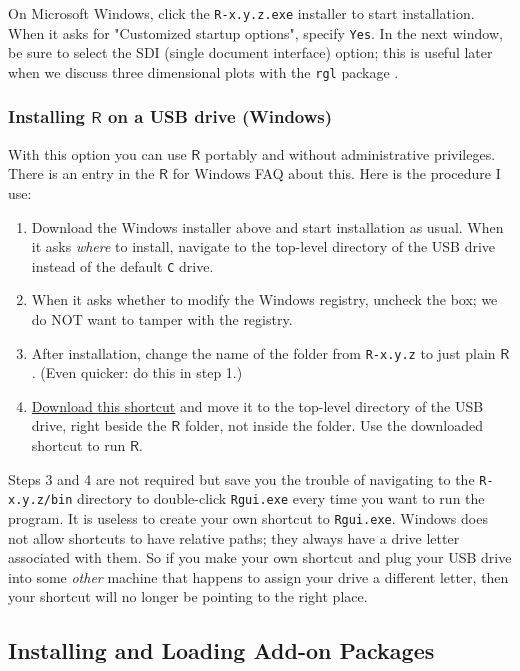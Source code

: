 On Microsoft Windows, click the \texttt{R-x.y.z.exe} installer to start
installation. When it asks for "Customized startup options", specify
\texttt{Yes}. In the next window, be sure to select the SDI (single document
interface) option; this is useful later when we discuss three
dimensional plots with the \texttt{rgl} package \cite{rgl}.

\subsubsection{Installing \(\mathsf{R}\) on a USB drive (Windows)}
\label{sec-2-1-1-1}

With this option you can use \(\mathsf{R}\) portably and without
administrative privileges. There is an entry in the \(\mathsf{R}\) for
Windows FAQ about this. Here is the procedure I use:
\begin{enumerate}
\item Download the Windows installer above and start installation as
usual. When it asks \emph{where} to install, navigate to the top-level
directory of the USB drive instead of the default \texttt{C} drive.
\item When it asks whether to modify the Windows registry, uncheck the
box; we do NOT want to tamper with the registry.
\item After installation, change the name of the folder from \texttt{R-x.y.z} to
just plain \(\mathsf{R}\). (Even quicker: do this in step 1.)
\item \href{http://ipsur.r-forge.r-project.org/book/download/R.exe}{Download this shortcut} and move it to the top-level directory of
the USB drive, right beside the \(\mathsf{R}\) folder, not inside
the folder. Use the downloaded shortcut to run \(\mathsf{R}\).
\end{enumerate}

Steps 3 and 4 are not required but save you the trouble of navigating
to the \texttt{R-x.y.z/bin} directory to double-click \texttt{Rgui.exe} every time
you want to run the program. It is useless to create your own shortcut
to \texttt{Rgui.exe}. Windows does not allow shortcuts to have relative
paths; they always have a drive letter associated with them. So if you
make your own shortcut and plug your USB drive into some \emph{other}
machine that happens to assign your drive a different letter, then
your shortcut will no longer be pointing to the right place.

\subsection{Installing and Loading Add-on Packages}
\label{sec-2-1-2}

